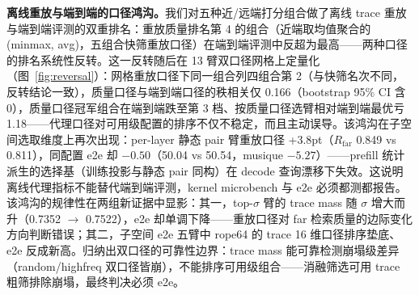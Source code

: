 \documentclass[11pt]{article}
\begin{document}
\textbf{离线重放与端到端的口径鸿沟。}我们对五种近/远端打分组合做了离线 trace 重放与端到端评测的双重排名：重放质量排名第 4 的组合（近端取均值聚合的 (minmax, avg)，五组合快筛重放口径）在端到端评测中反超为最高——两种口径的排名系统性反转。这一反转随后在 13 臂双口径网格上定量化（图~\ref{fig:reversal}）：网格重放口径下同一组合列四组合第 2（与快筛名次不同，反转结论一致），质量口径与端到端口径的秩相关仅 0.166（bootstrap 95\% CI 含 0），质量口径冠军组合在端到端跌至第 3 档、按质量口径选臂相对端到端最优亏 1.18——代理口径对可用级配置的排序不仅不稳定，而且主动误导。该鸿沟在子空间选取维度上再次出现：per-layer 静态 pair 臂重放口径 +3.8pt（$R_{\mathrm{far}}$ 0.849 vs 0.811），同配置 e2e 却 $-0.50$（50.04 vs 50.54，musique $-5.27$）——prefill 统计派生的选择基（训练投影与静态 pair 同构）在 decode 查询漂移下失效。这说明离线代理指标不能替代端到端评测，kernel microbench 与 e2e 必须都测都报告。该鸿沟的规律性在两组新证据中显影：其一，top-$\sigma$ 臂的 trace mass 随 $\sigma$ 增大而升（0.7352 $\rightarrow$ 0.7522），e2e 却单调下降——重放口径对 far 检索质量的边际变化方向判断错误；其二，子空间 e2e 五臂中 rope64 的 trace 16 维口径排序垫底、e2e 反成新高。归纳出双口径的可靠性边界：trace mass 能可靠检测崩塌级差异（random/highfreq 双口径皆崩），不能排序可用级组合——消融筛选可用 trace 粗筛排除崩塌，最终判决必须 e2e。
\end{document}
